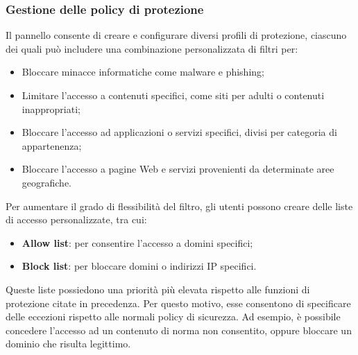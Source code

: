 \subsubsection{Gestione delle policy di protezione}
Il pannello consente di creare e configurare diversi profili di protezione, ciascuno dei quali può includere una combinazione personalizzata di filtri per:
\begin{itemize}
  \item Bloccare minacce informatiche come malware e phishing;
  \item Limitare l'accesso a contenuti specifici, come siti per adulti o contenuti inappropriati;
  \item Bloccare l'accesso ad applicazioni o servizi specifici, divisi per categoria di appartenenza;
  \item Bloccare l'accesso a pagine Web e servizi provenienti da determinate aree geografiche.
\end{itemize}
Per aumentare il grado di flessibilità del filtro, gli utenti possono creare delle liste di accesso personalizzate, tra cui:
\begin{itemize}
  \item \textbf{Allow list}: per consentire l'accesso a domini specifici;
  \item \textbf{Block list}: per bloccare domini o indirizzi IP specifici.
\end{itemize}
Queste liste possiedono una priorità più elevata rispetto alle funzioni di protezione citate in precedenza. Per questo motivo, esse consentono di specificare delle eccezioni rispetto alle normali policy di sicurezza. Ad esempio, è possibile concedere l'accesso ad un contenuto di norma non consentito, oppure bloccare un dominio che risulta legittimo.

